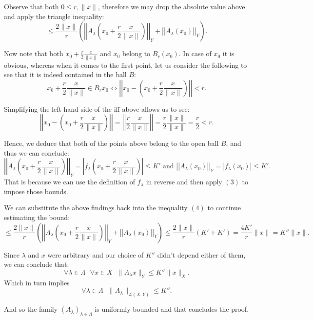 \documentclass[11pt]{article}
\newcommand\sep{\text{ }}
\begin{document}
Observe that both $0 \le r, \|x\|$, therefore we may drop the absolute value above
and apply the triangle inequality:
\begin{equation}
 \le \frac{2\|x\|}{r} \left( \left|\left| A_\lambda\left( x_0 + \frac{r}{2}\frac{x}{\|x\|} \right)
 \right|\right|_Y + \left|\left| A_\lambda(x_0)  \right|\right|_Y \right)
.\end{equation}

Now note that both $x_0 + \frac{r}{2}\frac{x}{\|x\|} $ and $x_0$ belong to $B_r(x_0)$.
In case of $x_0$ it is obvious, whereas when it comes to the first point, let us
consider the following to see that it is indeed contained in the ball  $B$:
\[
  x_0 + \frac{r}{2}\frac{x}{\|x\|} \in B_r{x_0} \iff \left|\left|x_0 - \left(x_0 + \frac{r}{2}\frac{x}{\|x\|}   \right) \right|\right| < r
.\]

Simplifying the left-hand side of the iff above allows us to see:
\[
\left|\left|x_0 - \left(x_0 + \frac{r}{2}\frac{x}{\|x\|}   \right) \right|\right| =
\left|\left| \frac{r}{2}\frac{x}{\|x\|}\right|\right| = \frac{r}{2} \frac{\|x\|}{\|x\|} = \frac{r}{2}  < r
.\]

Hence, we deduce that both of the points above belong to the open ball $B$, and
thus we can conclude:
\[
  \left|\left| A_\lambda\left( x_0 + \frac{r}{2}\frac{x}{\|x\|} \right)\right|\right|_Y = \left| f_\lambda\left( x_0 + \frac{r}{2}\frac{x}{\|x\|} \right)\right| \le K' \text{ and }
\left|\left| A_\lambda(x_0)  \right|\right|_Y = \left| f_\lambda(x_0)  \right| \le K'
.\]
That is because we can use the definition of $f_\lambda$ in reverse and then apply
 $(3)$ to impose those bounds.

 We can substitute the above findings back into the inequality $(4)$ to continue
 estimating the bound:
 \[
 \le \frac{2\|x\|}{r} \left( \left|\left| A_\lambda\left( x_0 + \frac{r}{2}\frac{x}{\|x\|} \right)
 \right|\right|_Y + \left|\left| A_\lambda(x_0)  \right|\right|_Y \right)
 \le \frac{2\|x\|}{r} \left( K' + K'\right) = \frac{4K'}{r}\|x\| = K''\|x\|
 .\]

 Since $\lambda$ and  $x$ were arbitrary and our choice of $K''$ didn't depend  either
 of them, we can conclude that:
\[
   \forall \lambda \in \Lambda \sep \forall x \in X \sep \|A_\lambda x\|_Y \le K'' \|x\|_X
.\]
Which in turn implies
\[
\forall \lambda \in \Lambda \sep \|A_\lambda\|_{\mathcal{L}\left( X, Y \right)}  \le K''.\]

And so the family $\left( A_\lambda \right)_{\lambda \in \Lambda} $ is uniformly
bounded and that concludes the proof. \hfill \blacksquare
\end{document}
